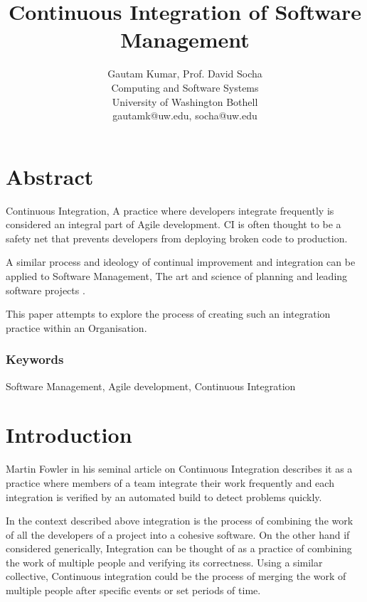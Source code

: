 \documentclass[10pt,conference]{IEEEtran}
\begin{document}
\title{Continuous Integration of Software Management}


\author{
{\rm Gautam Kumar, Prof. David Socha}\\
Computing and Software Systems\\
University of Washington Bothell\\
gautamk@uw.edu, socha@uw.edu
} %

\maketitle
\thispagestyle{empty}


\section*{Abstract}
Continuous Integration, A practice where developers integrate 
frequently \cite{stahl_modeling_2014} is considered an integral part of Agile 
development. CI is often thought to be a safety net that prevents developers from deploying broken code to production. 

A similar process and ideology of continual improvement and integration can be applied to Software Management, The art and science of planning and leading software projects \cite{stellman_applied_2005}.

This paper attempts to explore the process of creating such an integration practice within an Organisation.

\subsubsection*{Keywords}

Software Management, Agile development, Continuous Integration

\section*{Introduction}

Martin Fowler in his seminal article \cite{fowler_continuous_2006} on Continuous Integration describes it as a practice where members of a team integrate their work frequently and each integration is verified by an automated build to detect problems quickly.

In the context described above integration is the process of combining the work of all the developers of a project into a cohesive software. On the other hand if considered generically, Integration can be thought of as a practice of combining the work of multiple people and verifying its correctness. Using a similar collective, Continuous integration could be the process of merging the work of multiple people after specific events or set periods of time.
\end{document}
